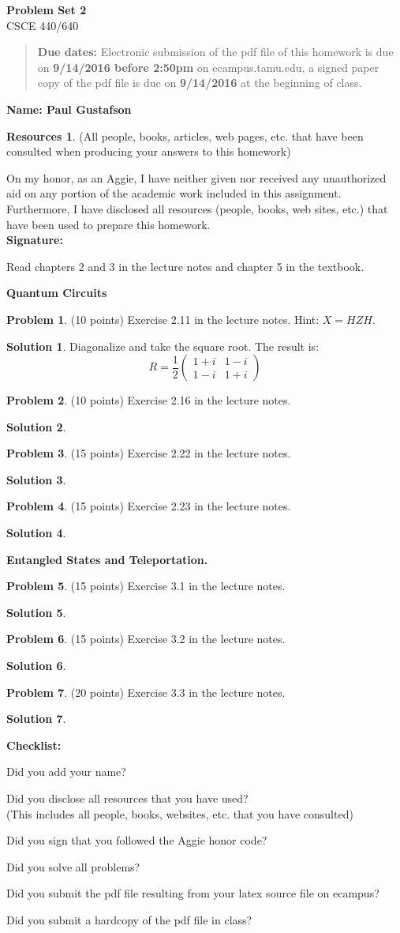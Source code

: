 \documentclass{article}
\theoremstyle{definition}
\newtheorem{problem}{Problem}
\newtheorem*{solution}{Solution}
\newtheorem*{resources}{Resources}
\newcommand{\name}[1]{\noindent\textbf{Name: #1}}
\newcommand{\honor}{\noindent On my honor, as an Aggie, I have neither
  given nor received any unauthorized aid on any portion of the
  academic work included in this assignment. Furthermore, I have
  disclosed all resources (people, books, web sites, etc.) that have
  been used to prepare this homework. \\[1ex]
 \textbf{Signature:} \underline{\hspace*{5cm}} }
\newcommand{\checklist}{\noindent\textbf{Checklist:}
\begin{compactitem}[$\Box$] 
\item Did you add your name? 
\item Did you disclose all resources that you have used? \\
(This includes all people, books, websites, etc. that you have consulted)
\item Did you sign that you followed the Aggie honor code? 
\item Did you solve all problems? 
\item Did you submit the pdf file resulting from your latex source
  file on ecampus? 
\item Did you submit a hardcopy of the pdf file in class? 
\end{compactitem}
}
\newcommand{\problemset}[1]{\begin{center}\textbf{Problem Set #1}\\ 
CSCE 440/640\end{center}}
\newcommand{\duedate}[2]{\begin{quote}\textbf{Due dates:} Electronic
    submission of the pdf file of this homework is due on \textbf{#1} on ecampus.tamu.edu, a signed paper copy
    of the pdf file is due on \textbf{#2} at the beginning of
    class. \end{quote} }
\begin{document}
\problemset{2}
\duedate{9/14/2016 before 2:50pm}{9/14/2016}
\name{ Paul Gustafson }
\begin{resources} (All people, books, articles, web pages, etc. that
  have been consulted when producing your answers to this homework)
\end{resources}
\honor

\newpage

\noindent Read chapters 2 and 3 in the lecture notes and chapter 5 in the textbook. \medskip

\noindent\textbf{Quantum Circuits}
\begin{problem} (10 points)
Exercise 2.11 in the lecture notes. Hint: $X=HZH$. 
\end{problem}
\begin{solution}
Diagonalize and take the square root. The result is:
$$R = 
\frac{1}{2} \begin{pmatrix}
 1 + i & 1 - i \\
1 - i & 1 + i
\end{pmatrix}
$$
\end{solution}

\begin{problem} (10 points)
Exercise 2.16 in the lecture notes. 
\end{problem}

\begin{solution}

\end{solution}

\begin{problem} (15 points)
Exercise 2.22 in the lecture notes.
\end{problem}
\begin{solution}
\end{solution}

\begin{problem} (15 points)
Exercise 2.23 in the lecture notes.
\end{problem}
\begin{solution}
\end{solution}


\noindent\textbf{Entangled States and Teleportation.} 
\begin{problem} (15 points)
Exercise 3.1 in the lecture notes.
\end{problem}
\begin{solution}
\end{solution}

\begin{problem} (15 points)
Exercise 3.2 in the lecture notes.
\end{problem}
\begin{solution}
\end{solution}

\begin{problem} (20 points)
Exercise 3.3 in the lecture notes. 
\end{problem}
\begin{solution}
\end{solution}









\goodbreak
\checklist
\end{document}
